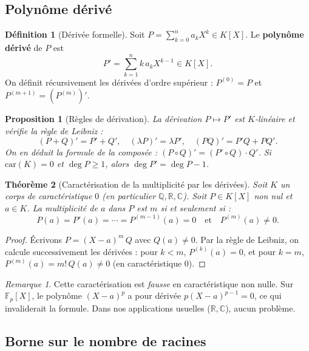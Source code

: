 \documentclass[12pt,a4paper]{report}
\newtheorem{theoreme}{Théorème}[section]
\newtheorem{proposition}[theoreme]{Proposition}
\theoremstyle{definition}
\newtheorem{definition}{Définition}[section]
\theoremstyle{remark}
\newtheorem{remarque}{Remarque}[section]
\begin{document}
\subsection{Polynôme dérivé}

\begin{definition}[Dérivée formelle]
Soit $P = \sum_{k=0}^{n} a_k X^k \in K[X]$. Le \textbf{polynôme dérivé} de $P$ est
\[ P' = \sum_{k=1}^{n} k\, a_k X^{k-1} \in K[X]. \]
On définit récursivement les dérivées d'ordre supérieur : $P^{(0)} = P$ et $P^{(m+1)} = (P^{(m)})'$.
\end{definition}

\begin{proposition}[Règles de dérivation]
La dérivation $P \mapsto P'$ est $K$-linéaire et vérifie la règle de Leibniz :
\[ (P + Q)' = P' + Q', \quad (\lambda P)' = \lambda P', \quad (PQ)' = P' Q + P Q'. \]
On en déduit la formule de la composée : $(P \circ Q)' = (P' \circ Q) \cdot Q'$.
Si $\mathrm{car}(K) = 0$ et $\deg P \ge 1$, alors $\deg P' = \deg P - 1$.
\end{proposition}

\begin{theoreme}[Caractérisation de la multiplicité par les dérivées]
Soit $K$ un corps de caractéristique $0$ (en particulier $\mathbb{Q}, \mathbb{R}, \mathbb{C}$). Soit $P \in K[X]$ non nul et $a \in K$. La multiplicité de $a$ dans $P$ est $m$ si et seulement si :
\[ P(a) = P'(a) = \cdots = P^{(m-1)}(a) = 0 \quad \text{et} \quad P^{(m)}(a) \neq 0. \]
\end{theoreme}

\begin{proof}
Écrivons $P = (X - a)^m\, Q$ avec $Q(a) \neq 0$. Par la règle de Leibniz, on calcule successivement les dérivées : pour $k < m$, $P^{(k)}(a) = 0$, et pour $k = m$, $P^{(m)}(a) = m!\, Q(a) \neq 0$ (en caractéristique $0$).
\end{proof}

\begin{remarque}
Cette caractérisation est \emph{fausse} en caractéristique non nulle. Sur $\mathbb{F}_p[X]$, le polynôme $(X - a)^p$ a pour dérivée $p(X-a)^{p-1} = 0$, ce qui invaliderait la formule. Dans nos applications usuelles ($\mathbb{R}, \mathbb{C}$), aucun problème.
\end{remarque}

\subsection{Borne sur le nombre de racines}
\end{document}
